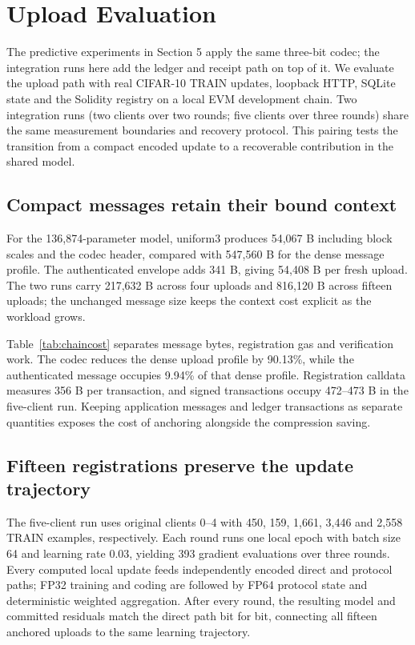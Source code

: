 \section{Upload Evaluation}\label{sec:uploadeval}
The predictive experiments in Section 5 apply the same three-bit codec; the integration runs here add the ledger and receipt path on top of it. We evaluate the upload path with real CIFAR-10 TRAIN updates, loopback HTTP, SQLite state and the Solidity registry on a local EVM development chain. Two integration runs (two clients over two rounds; five clients over three rounds) share the same measurement boundaries and recovery protocol. This pairing tests the transition from a compact encoded update to a recoverable contribution in the shared model.

\subsection{Compact messages retain their bound context}
For the 136,874-parameter model, uniform3 produces 54,067 B including block scales and the codec header, compared with 547,560 B for the dense message profile. The authenticated envelope adds 341 B, giving 54,408 B per fresh upload. The two runs carry 217,632 B across four uploads and 816,120 B across fifteen uploads; the unchanged message size keeps the context cost explicit as the workload grows.

Table~\ref{tab:chaincost} separates message bytes, registration gas and verification work. The codec reduces the dense upload profile by 90.13\%, while the authenticated message occupies 9.94\% of that dense profile. Registration calldata measures 356 B per transaction, and signed transactions occupy 472--473 B in the five-client run. Keeping application messages and ledger transactions as separate quantities exposes the cost of anchoring alongside the compression saving.


\subsection{Fifteen registrations preserve the update trajectory}
The five-client run uses original clients 0--4 with 450, 159, 1,661, 3,446 and 2,558 TRAIN examples, respectively. Each round runs one local epoch with batch size 64 and learning rate 0.03, yielding 393 gradient evaluations over three rounds. Every computed local update feeds independently encoded direct and protocol paths; FP32 training and coding are followed by FP64 protocol state and deterministic weighted aggregation. After every round, the resulting model and committed residuals match the direct path bit for bit, connecting all fifteen anchored uploads to the same learning trajectory.

